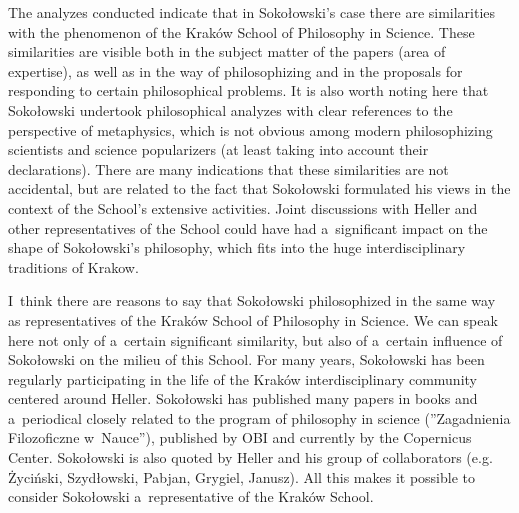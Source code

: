 \documentclass[%
  manuscript=article,
  year=2024,
  volume=77,
  doi=10.59203/zfn.77.689,
]{zfn}
\begin{document}
The analyzes conducted indicate that in Sokołowski's case there are similarities with the phenomenon of the Kraków School of Philosophy in Science. These similarities are visible both in the subject matter of the papers (area of expertise), as well as in the way of philosophizing and in the proposals for responding to certain philosophical problems. It is also worth noting here that Sokołowski undertook philosophical analyzes with clear references to the perspective of metaphysics, which is not obvious among modern philosophizing scientists and science popularizers (at least taking into account their declarations). There are many indications that these similarities are not accidental, but are related to the fact that Sokołowski formulated his views in the context of the School's extensive activities. Joint discussions with Heller and other representatives of the School could have had a~significant impact on the shape of Sokołowski's philosophy, which fits into the huge interdisciplinary traditions of Krakow.



I~think there are reasons to say that Sokołowski philosophized in the same way as representatives of the Kraków School of Philosophy in Science. We can speak here not only of a~certain significant similarity, but also of a~certain influence of Sokołowski on the milieu of this School. For many years, Sokołowski has been regularly participating in the life of the Kraków interdisciplinary community centered around Heller. Sokołowski has published many papers in books and a~periodical closely related to the program of philosophy in science (''Zagadnienia Filozoficzne w~Nauce''), published by OBI and currently by the Copernicus Center. Sokołowski is also quoted by Heller and his group of collaborators (e.g. Życiński, Szydłowski, Pabjan, Grygiel, Janusz). All this makes it possible to consider Sokołowski a~representative of the Kraków School.
\end{document}
